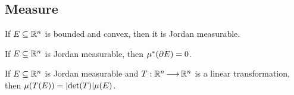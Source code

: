 \subsection{Measure}

\begin{thm}
    If $ E \subseteq \mathbb{R}^{n} $ is bounded and convex, then it is Jordan
    measurable.
\end{thm}

\begin{thm}
    If $ E \subseteq \mathbb{R}^{n} $ is Jordan measurable, then $ \mu^{*}(\partial E) = 0 $.
\end{thm}

\begin{thm}
    If $ E \subseteq \mathbb{R}^{n} $ is Jordan measurable and $ T:\mathbb{R}^{n} \operatorname{\longrightarrow}
    \mathbb{R}^{n} $ is a linear transformation, then $ \mu(T(E)) = \abs{\det(T)}
    \mu(E) $.
\end{thm}


